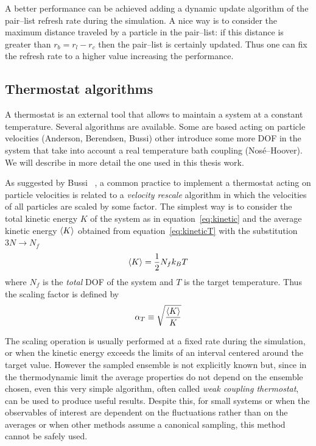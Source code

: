 A better performance can be achieved adding a dynamic update algorithm of the pair--list refresh rate during the
simulation. A nice way is to consider the maximum distance traveled by a particle in the pair--list: if this
distance is greater than $r_b = r_l - r_c$ then the pair--list is certainly updated. Thus one can fix the refresh
rate to a higher value increasing the performance.

\subsection{Thermostat algorithms} %
A thermostat is an external tool that allows to maintain a system at a constant temperature. Several algorithms
are available. Some are based acting on particle velocities (Anderson, Berendsen, Bussi) other introduce some
more \ac{DOF} in the system that take into account a real temperature bath coupling (Nosé--Hoover). We will
describe in more detail the one used in this thesis work.

As suggested by Bussi \etal\, \cite{Bussi}, a common practice to implement a thermostat acting on particle
velocities is related to a \textit{velocity rescale} algorithm in which the velocities of all particles are
scaled by some factor. The simplest way is to consider the total kinetic energy $K$ of the system as in
equation~\eqref{eq:kinetic} and the average kinetic energy $\left \langle K \right \rangle$ obtained from equation~\eqref{eq:kineticT}
with the substitution $3N\rightarrow N_f$
\begin{equation*}
	\left \langle K \right \rangle = \frac{1}{2}N_f k_B T
\end{equation*}
where $N_f$ is the \textit{total} \ac{DOF} of the system and $T$ is the target temperature. Thus the scaling
factor is defined by
\begin{equation*}
	\alpha_{T} \equiv \sqrt{\frac{\left \langle K \right \rangle}{K}}
\end{equation*}

The scaling operation is usually performed at a fixed rate during the simulation, or when the kinetic energy
exceeds the limits of an interval centered around the target value. However the sampled ensemble is not
explicitly known but, since in the thermodynamic limit the average properties do not depend on the ensemble
chosen, even this very simple algorithm, often called \textit{weak coupling thermostat}, can be used to produce
useful results. Despite this, for small systems or when the observables of interest are dependent on the
fluctuations rather than on the averages or when other methods assume a canonical sampling, this method cannot be
safely used.

